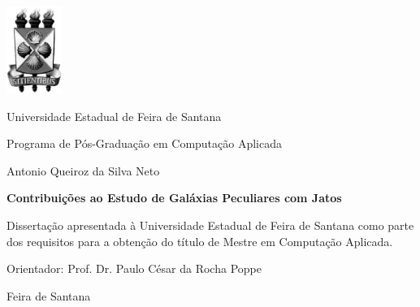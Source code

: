 \begin{titlepage}

\begin{center}

\includegraphics[width=18mm]{cover/logoUEFSBlackWhite} \\

\large

Universidade Estadual de Feira de Santana

Programa de Pós-Graduação em Computação Aplicada

\vspace*{5cm}

\Large{Antonio Queiroz da Silva Neto}

\vspace{.5cm}

\Large\textbf{Contribuições ao Estudo de Galáxias
Peculiares com Jatos}

\begin{adjustwidth}{8cm}{}
\normalsize{Dissertação apresentada à Universidade Estadual de Feira de Santana como parte dos requisitos para a obtenção do título de Mestre em Computação Aplicada.}
\end{adjustwidth}

\vspace{1cm}

\normalsize{Orientador: Prof. Dr. Paulo César da Rocha Poppe}



\vfill


\vspace{.5cm}

Feira de Santana

\the\year
\end{center}

\end{titlepage}




